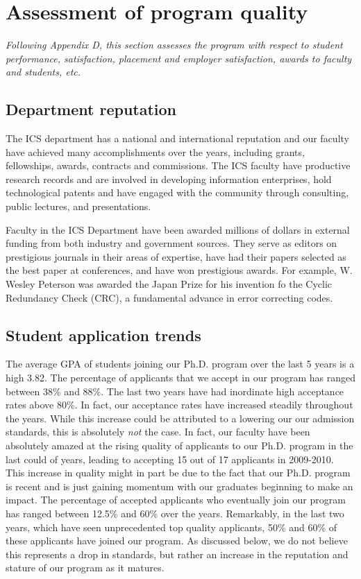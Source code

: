 \documentclass[12pt]{article}
\begin{document}
\section{Assessment of program quality}

{\em Following Appendix D, this section assesses the program with respect
  to student performance, satisfaction, placement and employer
  satisfaction, awards to faculty and students, etc.}

\subsection{Department reputation}

The ICS department has a national and international reputation and our
faculty have achieved many accomplishments over the years, including
grants, fellowships, awards, contracts and commissions. The ICS faculty
have productive research records and are involved in developing information
enterprises, hold technological patents and have engaged with the community
through consulting, public lectures, and presentations. 

Faculty in the ICS Department have been awarded millions of dollars in
external funding from both industry and government sources.  They serve
as editors on prestigious journals in their areas of expertise, have had
their papers selected as the best paper at conferences, and have won
prestigious awards.  For example, W. Wesley Peterson was awarded the Japan
Prize for his invention fo the Cyclic Redundancy Check (CRC), a fundamental
advance in error correcting codes.


\subsection{Student application trends}

The average GPA of students joining our Ph.D. program over the last 5 years
is a high 3.82. The percentage of applicants that we accept in our program
has ranged between 38\% and 88\%. The last two years have had inordinate
high acceptance rates above 80\%. In fact, our acceptance rates have
increased steadily throughout the years. While this increase could be
attributed to a lowering our our admission standards, this is absolutely
\emph{not} the case. In fact, our faculty have been absolutely amazed at
the rising quality of applicants to our Ph.D. program in the last could of
years, leading to accepting 15 out of 17 applicants in 2009-2010. This
increase in quality might in part be due to the fact that our Ph.D. program
is recent and is just gaining momentum with our graduates beginning to make
an impact.  The percentage of accepted applicants who eventually join our
program has ranged between 12.5\% and 60\% over the years. Remarkably, in
the last two years, which have seen unprecedented top quality applicants,
50\% and 60\% of these applicants have joined our program. As discussed
below, we do not believe this represents a drop in standards, but rather an increase
in the reputation and stature of our program as it matures.
\end{document}
